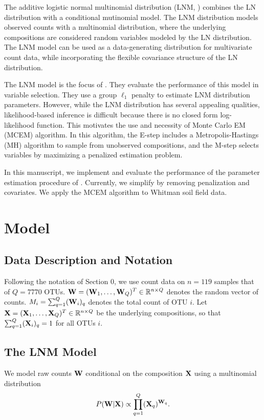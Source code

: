 \documentclass{template}
\begin{document}
The additive logistic normal multinomial distribution (LNM, \cite{billheimer2001statistical}) combines the LN distribution with a conditional mutinomial model. The LNM distribution models observed counts with a multinomial distribution, where the underlying compositions are considered random variables modeled by the LN distribution. The LNM model can be used as a data-generating distribution for multivariate count data, while incorporating the flexible covariance structure of the LN distribution. 

The LNM model is the focus of  \cite{xia2013logistic}. They evaluate the performance of this model in variable selection. They use a group $\ell_1$ penalty to estimate LNM distribution parameters. However, while the LNM distribution has several appealing qualities, likelihood-based inference is difficult because there is no closed form log-likelihood function. This motivates the use and necessity of Monte Carlo EM (MCEM) algorithm. In this algorithm, the E-step includes a  Metropolis-Hastings (MH) algorithm to sample from unobserved compositions, and the M-step selects variables by maximizing a penalized estimation problem.

In this manuscript, we implement and evaluate the performance of the parameter estimation procedure of \cite{xia2013logistic}. Currently, we simplify by removing penalization and covariates. We apply the MCEM algorithm to Whitman soil field data.


\section{Model}
\subsection{Data Description and Notation}
Following the notation of Section 0, we use count data on $n=119$ samples that of $Q=7770$ OTUs. $\mathbf{W}=(\mathbf{W}_1,\ldots,\mathbf{W}_{Q})^T\in\mathbb{R}^{n\times Q}$ denotes the random vector of counts. $M_i=\sum_{q=1}^{Q} (\mathbf{W}_i)_q$ denotes the total count of OTU $i$. Let $\mathbf{X}=(\mathbf{X}_1,\ldots,\mathbf{X}_{Q})^T\in\mathbb{R}^{n\times Q}$ be the underlying compositions, so that $\sum_{q=1}^Q (\mathbf{X}_{i})_q=1$ for all OTUs $i$.

\subsection{The LNM Model}
We model raw counts $\mathbf{W}$ conditional on the composition $\mathbf{X}$ using a multinomial distribution
$$P(\mathbf{W}|\mathbf{X})\propto \prod_{q=1}^{Q} (\mathbf{X}_q)^{\mathbf{W}_q}.$$
\end{document}
